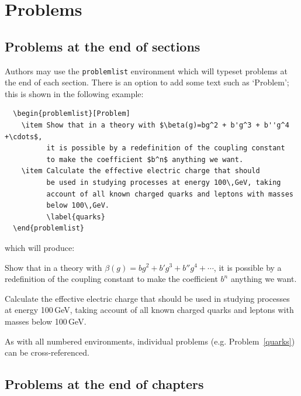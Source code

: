 \section{Problems}

\subsection{Problems at the end of sections}
\label{probendofsections}

Authors may use the \verb"problemlist" environment which will typeset problems at the end of each section. There is an option to add some text such as `Problem'; this is shown in the following example:
\begin{verbatim}
  \begin{problemlist}[Problem]
    \item Show that in a theory with $\beta(g)=bg^2 + b'g^3 + b''g^4 +\cdots$,
          it is possible by a redefinition of the coupling constant
          to make the coefficient $b^n$ anything we want.
    \item Calculate the effective electric charge that should
          be used in studying processes at energy 100\,GeV, taking
          account of all known charged quarks and leptons with masses
          below 100\,GeV.
          \label{quarks}
  \end{problemlist}
\end{verbatim}
which will produce:
  \begin{problemlist}[Problem]
    \item Show that in a theory with $\beta(g)=bg^2 + b'g^3 + b''g^4 +\cdots$,
          it is possible by a redefinition of the coupling constant
          to make the coefficient $b^n$ anything we want.
    \item Calculate the effective electric charge that should
          be used in studying processes at energy 100\,GeV, taking
          account of all known charged quarks and leptons with masses
          below 100\,GeV.
          \label{quarks}
  \end{problemlist}
As with all numbered environments, individual problems (e.g. Problem~\ref{quarks}) can be cross-referenced.

\subsection{Problems at the end of chapters}

